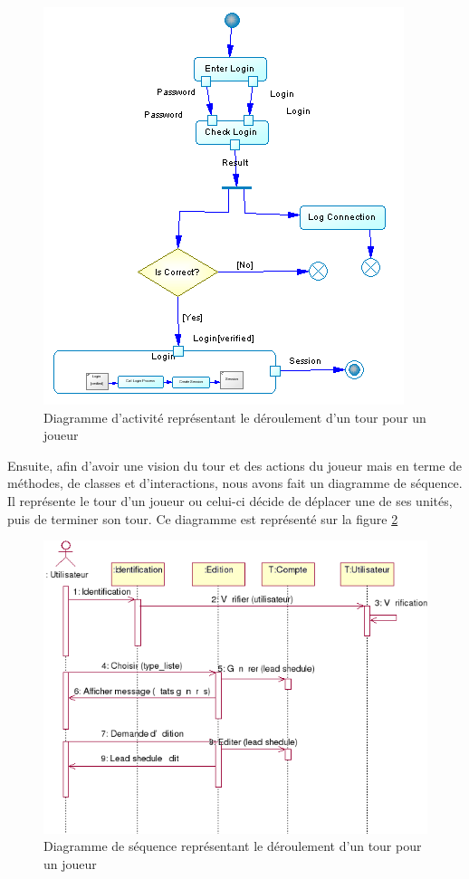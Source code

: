 \begin{figure}[!h] 
\centerline{\includegraphics[scale=0.60]{img/activite_tour_ex.png}}
   \caption{\label{étiquette} Diagramme d'activité représentant le déroulement d'un tour pour un joueur}
\label{activiteTour}
\end{figure}

Ensuite, afin d'avoir une vision du tour et des actions du joueur mais en terme de méthodes, de classes et d'interactions, nous avons fait un diagramme de séquence. Il représente le tour d'un joueur ou celui-ci décide de déplacer une de ses unités, puis de terminer son tour. Ce diagramme est représenté sur la figure \ref{sequenceTour}

\begin{figure}[!h] 
\centerline{\includegraphics[scale=0.60]{img/sequence_tour_ex.png}}
   \caption{\label{étiquette} Diagramme de séquence représentant le déroulement d'un tour pour un joueur}
\label{sequenceTour}
\end{figure}

